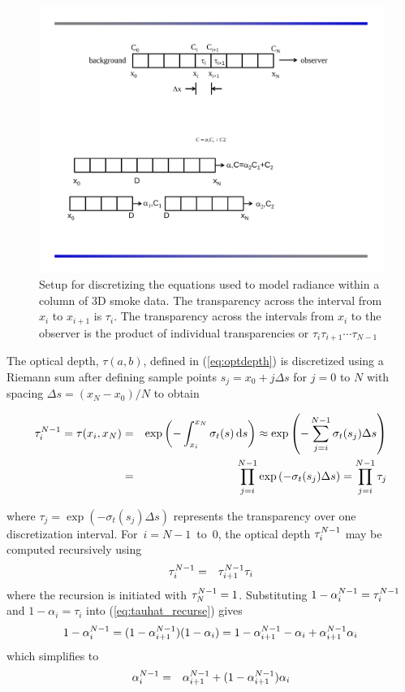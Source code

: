 \begin{figure}[\figoptions]
\begin{center}
\includegraphics[width=5.0in]{FIGURES/smoke_discrete_setup}
\end{center}
\caption[Setup for discretizing the equations used to model
radiance within a column of 3D smoke data.]{Setup for discretizing
the equations used to model radiance within a column of 3D smoke
data. The transparency across the interval from $x_i$ to $x_{i+1}$
is $\tau_i$. The transparency across the intervals from $x_i$ to
the observer is the product of individual transparencies or
$\tau_i\tau_{i+1}\cdots\tau_{N-1}$} \label{fig:smokediscretesetup}
\end{figure}

The optical depth, $\tau(a,b)$, defined in (\ref{eq:optdepth}) is
discretized using a Riemann sum  after defining sample points
$s_j=x_0+j\Delta s$ for $j=0$ to $N$ with spacing $\Delta
s=(x_N-x_0)/N$ to obtain

\begin{eqnarray}
\tau_{i}^{N-1}=\tau(x_i,x_N)&=&\exp\left(-\int_{x_i}^{x_N}\sigma_t(s)\,\mbox{d}s\right)\approx\exp\left(-\sum_{j=i}^{N-1}\sigma_t(s_j)\Delta s\right)\\
&=&\prod_{j=i}^{N-1}\exp\left(-\sigma_t(s_j)\Delta s\right)=\prod_{j=i}^{N-1}\tau_j
\end{eqnarray}

\noindent where $\tau_j=\exp\left(-\sigma_t(s_j)\Delta s\right)$
represents the transparency over one discretization interval.
For~$i=N-1$~to~$0$, the optical depth $\tau_{i}^{N-1}$ may be computed
recursively using
\begin{eqnarray}
\label{eq:tauhat_recurse}
\tau_{i}^{N-1}&=&\tau_{i+1}^{N-1}\tau_i
\end{eqnarray}
\noindent where the recursion is initiated with $\tau_{N}^{N-1}=1$.
Substituting $1-\alpha_{i}^{N-1}=\tau_{i}^{N-1}$ and $1-\alpha_i=\tau_i$ into
(\ref{eq:tauhat_recurse}) gives
\begin{eqnarray}
1-\alpha_{i}^{N-1}=(1-\alpha_{i+1}^{N-1})(1-\alpha_i)=1-\alpha_{i+1}^{N-1} - \alpha_i + \alpha_{i+1}^{N-1}\alpha_i
\end{eqnarray}
which simplifies to
\begin{eqnarray}
\label{eq:alpha2}
\alpha_{i}^{N-1}&=&\alpha_{i+1}^{N-1} + (1-\alpha_{i+1}^{N-1})\alpha_i
\end{eqnarray}

